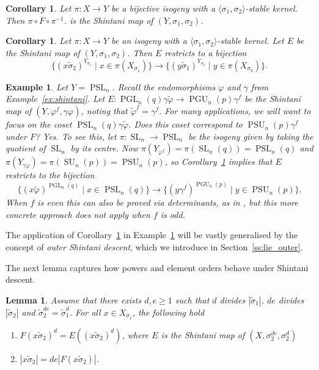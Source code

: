 \documentclass[11pt]{article}
\numberwithin{equation}{section}
\theoremstyle{shdefinition}
\newtheorem{example}[definition]{Example}
\theoremstyle{shplain}
\newtheorem{corollary}[definition]{Corollary}
\newtheorem{lemma}[definition]{Lemma}
\newcommand{\g}{\gamma}
\newcommand{\p}{\varphi}
\renewcommand{\wp}{\widetilde{\varphi}}
\newcommand{\s}{\sigma}
\newcommand{\ws}{\widetilde{\sigma}}
\newcommand{\<}{\langle}
\renewcommand{\>}{\rangle}
\renewcommand{\geq}{\geqslant}
\renewcommand{\:}{\colon}
\newcommand{\SL}{\operatorname{SL}}
\newcommand{\PSL}{\operatorname{PSL}}
\newcommand{\PGL}{\operatorname{PGL}}
\newcommand{\SU}{\operatorname{SU}}
\newcommand{\PSU}{\operatorname{PSU}}
\newcommand{\PGU}{\operatorname{PGU}}
\begin{document}
\begin{corollary} \label{cor:shintani_bijective_isogeny}
Let $\pi\:X \to Y$ be a bijective isogeny with a $\<\s_1,\s_2\>$-stable kernel. Then $\pi \circ F \circ \pi^{-1}$. is the Shintani map of $(Y,\s_1,\s_2)$. 
\end{corollary}

\begin{corollary} \label{cor:shintani_isogeny}
Let $\pi\:X \to Y$ be an isogeny with a $\<\s_1,\s_2\>$-stable kernel. Let $E$ be the Shintani map of $(Y,\s_1,\s_2)$. Then $E$ restricts to a bijection
\[
\{ (x\ws_2)^{Y_{\s_1}} \mid x \in \pi(X_{\s_1}) \} \to \{ (y\ws_1)^{Y_{\s_2}} \mid y \in \pi(X_{\s_2}) \}.
\]
\end{corollary}

\begin{example} \label{ex:shintani_isogeny}
Let $Y = \PSL_n$. Recall the endomorphisms $\p$ and $\g$ from Example~\ref{ex:shintani}. Let $E\:\PGL_n(q)\g\wp \to \PGU_n(p)\g^f$ be the Shintani map of $(Y,\p^f,\g\p)$, noting that $\wp^f = \g^f$. For many applications, we will want to focus on the coset $\PSL_n(q)\g\wp$. Does this coset correspond to $\PSU_n(p)\g^f$ under $F$? Yes. To see this, let $\pi\: \SL_n \to \PSL_n$ be the isogeny given by taking the quotient of $\SL_n$ by its centre. Now $\pi(Y_{\p^f}) = \pi(\SL_n(q)) = \PSL_n(q)$ and $\pi(Y_{\g\p}) = \pi(\SU_n(p)) = \PSU_n(p)$, so Corollary~\ref{cor:shintani_isogeny} implies that $E$ restricts to the bijection
\[
\{ (x\wp)^{\PGL_n(q)} \mid x \in \PSL_n(q) \} \to \{ (y\g^f)^{\PGU_n(p)} \mid y \in \PSU_n(p) \}.
\]
When $f$ is even this can also be proved via determinants, as in \cite[Lemma~5.3]{ref:BurnessGuest13}, but this more concrete approach does not apply when $f$ is odd.
\end{example}

The application of Corollary~\ref{cor:shintani_isogeny} in Example~\ref{ex:shintani_isogeny} will be vastly generalised by the concept of \emph{outer Shintani descent}, which we introduce in Section~\ref{ss:lie_outer}.

The next lemma captures how powers and element orders behave under Shintani descent.

\begin{lemma} \label{lem:shintani_order}
Assume that there exists $d,e \geq 1$ such that $d$ divides $|\ws_1|$, $de$ divides $|\ws_2|$ and $\ws_2^{de} = \ws_1^d$. For all $x \in X_{\s_1}$, the following hold
\begin{enumerate}
\item $F(x\ws_2)^d = E((x\ws_2)^d)$, where $E$ is the Shintani map of $(X,\s_2^{de},\s_2^d)$
\item $|x\ws_2| = de|F(x\ws_2)|$.
\end{enumerate}
\end{lemma}
\end{document}
